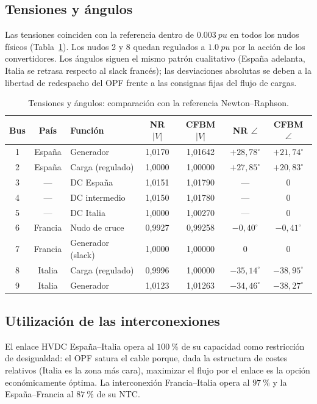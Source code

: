 \documentclass[12pt,a4paper]{iit-project-draft-report}
\begin{document}
\subsection{Tensiones y ángulos}

Las tensiones coinciden con la referencia dentro de $\SI{0.003}{pu}$ en
todos los nudos físicos (Tabla~\ref{tab:voltages}). Los nudos 2 y 8 quedan
regulados a $\SI{1.0}{pu}$ por la acción de los convertidores. Los
ángulos siguen el mismo patrón cualitativo (España adelanta, Italia se
retrasa respecto al slack francés); las desviaciones absolutas se deben
a la libertad de redespacho del \gls{OPF} frente a las consignas fijas
del flujo de cargas.

\begin{table}[h]
\centering
\caption{Tensiones y ángulos: comparación con la referencia Newton--Raphson.}
\label{tab:voltages}
\begin{tabular}{cclcccc}
\toprule
Bus & País & Función & NR $|V|$ & CFBM $|V|$ & NR $\angle$ & CFBM $\angle$ \\
\midrule
1 & España & Generador & 1{,}0170 & 1{,}01642 & $+28{,}78^\circ$ & $+21{,}74^\circ$ \\
2 & España & Carga (regulado) & 1{,}0000 & 1{,}00000 & $+27{,}85^\circ$ & $+20{,}83^\circ$ \\
3 & --- & DC España & 1{,}0151 & 1{,}01790 & --- & $0$ \\
4 & --- & DC intermedio & 1{,}0150 & 1{,}01780 & --- & $0$ \\
5 & --- & DC Italia & 1{,}0000 & 1{,}00270 & --- & $0$ \\
6 & Francia & Nudo de cruce & 0{,}9927 & 0{,}99258 & $-0{,}40^\circ$ & $-0{,}41^\circ$ \\
7 & Francia & Generador (slack) & 1{,}0000 & 1{,}00000 & $0$ & $0$ \\
8 & Italia & Carga (regulado) & 0{,}9996 & 1{,}00000 & $-35{,}14^\circ$ & $-38{,}95^\circ$ \\
9 & Italia & Generador & 1{,}0123 & 1{,}01263 & $-34{,}46^\circ$ & $-38{,}27^\circ$ \\
\bottomrule
\end{tabular}
\end{table}

\subsection{Utilización de las interconexiones}

El enlace \gls{HVDC} España--Italia opera al $\SI{100}{\percent}$ de su
capacidad como restricción de desigualdad: el \gls{OPF} satura el cable
porque, dada la estructura de costes relativos (Italia es la zona más
cara), maximizar el flujo por el enlace es la opción económicamente
óptima. La interconexión Francia--Italia opera al $\SI{97}{\percent}$ y
la España--Francia al $\SI{87}{\percent}$ de su \gls{NTC}.
\end{document}
